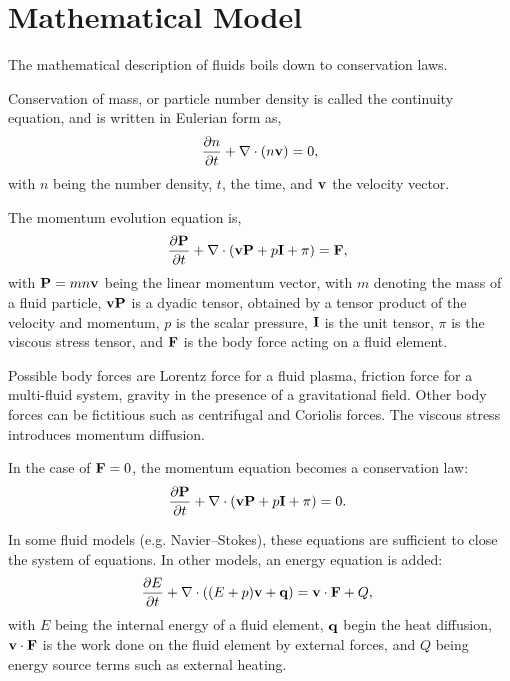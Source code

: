 \section{Mathematical Model}

The mathematical description of fluids boils down to conservation laws. 

Conservation of mass, or particle number density is called the continuity equation, and is written in Eulerian form as,
\begin{gather}
	\frac{\partial n}{\partial t} + \nabla \cdot (n \mathbf{v}) = 0,
\end{gather}
with $n$ being the number density, $t$, the time, and $\mathbf{v}$ the velocity vector.

The momentum evolution equation is,
\begin{gather}
    \frac{\partial \mathbf{P}}{\partial t} + \nabla \cdot\left(\mathbf{v} \mathbf{P} + p \mathbf{I} + \pi\right) =  \mathbf{F},~\label{eq:momentum}
\end{gather}
with $\mathbf{P} = m n \mathbf{v}$ being the linear momentum vector, with $m$ denoting the mass of a fluid particle, $\mathbf{v} \mathbf{P}$ is a dyadic tensor, obtained by a tensor product of the velocity and momentum, $p$ is the scalar pressure, $\mathbf{I}$ is the unit tensor, $\pi$ is the viscous stress tensor, and $\mathbf{F}$ is the body force acting on a fluid element.

Possible body forces are Lorentz force for a fluid plasma, friction force for a multi-fluid system, gravity in the presence of a gravitational field. Other body forces can be fictitious such as centrifugal and Coriolis forces. The viscous stress introduces momentum diffusion.

In the case of $\mathbf{F}=0$, the momentum equation becomes a conservation law:
\begin{gather}
    \frac{\partial \mathbf{P}}{\partial t} + \nabla \cdot\left(\mathbf{v} \mathbf{P} + p \mathbf{I} + \pi\right) =  0.~\label{eq:momentum_conservation}
\end{gather}

In some fluid models (e.g. Navier–Stokes), these equations are sufficient to close the system of equations. In other models, an energy equation is added:
\begin{gather}
    \frac{\partial E}{\partial t} + \nabla \cdot\left( (E + p)\mathbf{v}+\mathbf{q}\right) =  \mathbf{v}\cdot\mathbf{F} + Q,~\label{eq:energy}
\end{gather}
with $E$ being the internal energy of a fluid element, $\mathbf{q}$ begin the heat diffusion, $\mathbf{v}\cdot\mathbf{F}$ is the work done on the fluid element by external forces, and $Q$ being energy source terms such as external heating.

